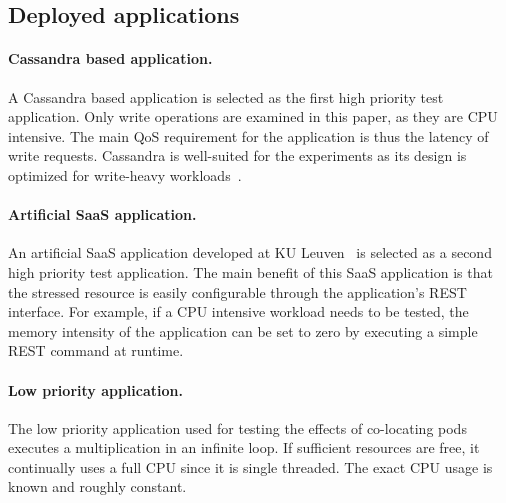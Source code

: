 \subsection{Deployed applications}
\label{test-apps}

\paragraph{Cassandra based application.}
A Cassandra based application is selected as the first high priority test application. Only write operations are examined in this paper, as they are CPU intensive. The main QoS requirement for the application is thus the latency of write requests. Cassandra is well-suited for the experiments as its design is optimized for write-heavy workloads~\citep{scalar}.

\paragraph{Artificial SaaS application.}
\label{setup:saas-app}
An artificial SaaS application developed at KU Leuven~\citep{saas-app} is selected as a second high priority test application. The main benefit of this SaaS application is that the stressed resource is easily configurable through the application's REST interface. For example, if a CPU intensive workload needs to be tested, the memory intensity of the application can be set to zero by executing a simple REST command at runtime. 

\paragraph{Low priority application.}
\label{setup:lpp}
The low priority application used for testing the effects of co-locating pods executes a multiplication in an infinite loop. If sufficient resources are free, it continually uses a full CPU since it is single threaded. The exact CPU usage is known and roughly constant.
